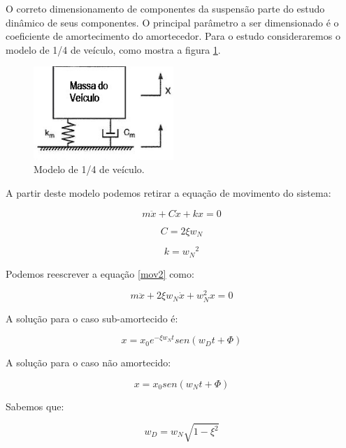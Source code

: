 O correto dimensionamento de componentes da suspensão parte do estudo dinâmico de seus componentes. O principal parâmetro a ser dimensionado é o coeficiente de amortecimento do amortecedor. Para o estudo consideraremos o modelo de 1/4 de veículo, como mostra a figura \ref{modelomassa}.

\begin{figure}[H]
	\centering
	\includegraphics[width=150pt]{figuras/sistema_massa.png}
	\caption{Modelo de 1/4 de veículo.}
	\label{modelomassa}
\end{figure}

A partir deste modelo podemos retirar a equação de movimento do sistema:

\begin{equation} \label{mov2}
m\ddot{x}+ C \dot{x} + kx = 0 
\end{equation} 

\begin{equation} \label{mov3} 
C=2\xi w_N 
\end{equation} 

\begin{equation} \label{mov4} 
k = {w_N}^2 
\end{equation} 

Podemos reescrever a equação \eqref{mov2} como:

\begin{equation} \label{mov5} 
m\ddot{x} + 2\xi w_N\dot{x} + w^2_Nx = 0
\end{equation} 

A solução para o caso sub-amortecido é:

\begin{equation} \label{mov6} 
x=x_0e^{-\xi w_Nt}sen\left(w_Dt + \Phi \right) 
\end{equation} 

A solução para o caso não amortecido:

\begin{equation} \label{mov7} 
x = x_0sen(w_Nt + \Phi)
\end{equation} 

Sabemos que:

\begin{equation} \label{mov8} 
w_D = w_N\sqrt{1 - {\xi }^2}
\end{equation} 

